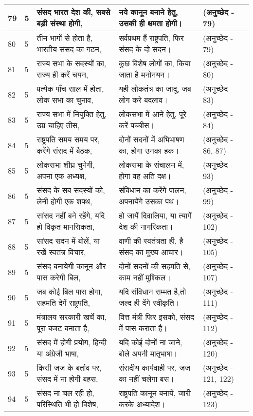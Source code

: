\begin{longtable}{|l|l|l|l|l|}
79 & 5 & संसद भारत देश की, सबसे बड़ी संस्था होगी, & नये कानून बनाने हेतु, उसकी ही क्षमता होगी। & (अनुच्छेद - 79) \\ \hline 
80 & 5 & तीन भागों से होता है, भारतीय संसद का गठन, & सर्वप्रथम हैं राष्ट्रपति, फिर संसद के दो सदन। & (अनुच्छेद - 79) \\ \hline 
81 & 5 & राज्य सभा के सदस्यों का, राज्य ही करें चयन, & कुछ विशेष लोगों का, किया जाता है मनोनयन। & (अनुच्छेद - 80) \\ \hline 
82 & 5 & प्रत्येक पाँच साल में होता, लोक सभा का चुनाव, & यही लोकतंत्र का जादू, जब लोग करे बदलाव। & (अनुच्छेद - 83) \\ \hline 
83 & 5 & राज्य सभा में नियुक्ति हेतु, उम्र चाहिए तीस, & लोकसभा में आने हेतु, पूरे करें पच्चीस। & (अनुच्छेद - 84) \\ \hline 
84 & 5 & राष्ट्रपति समय समय पर, करेंगे संसद में बैठक, & दोनों सदनों में अभिभाषण का, होगा उनका हक। & (अनुच्छेद - 86, 87) \\ \hline 
85 & 5 & लोकसभा शीघ्र चुनेगी, अपना एक अध्यक्ष, & लोकसभा के संचालन में, होगा वह अति दक्ष। & (अनुच्छेद - 93) \\ \hline 
86 & 5 & संसद के सब सदस्यों को, लेनी होगी एक शपथ, & संविधान का करेंगे पालन, अपनायेंगे उसका पथ। & (अनुच्छेद - 99) \\ \hline 
87 & 5 & सांसद नहीं बने रहेंगे, यदि हो विकृत मानसिकता, & हो जायें दिवालिया, या त्यागें देश की नागरिकता। & (अनुच्छेद - 102) \\ \hline 
88 & 5 & सांसद सदन में बोलें, या रखें स्वतंत्र विचार, & वाणी की स्वतंत्रता ही, है संसद का मुख्य आचार। & (अनुच्छेद - 105) \\ \hline 
89 & 5 & संसद बनायेगी कानून और पास करेगी बिल, & दोनों सदनों की सहमति से, काम नहीं मुश्किल। & (अनुच्छेद - 107) \\ \hline 
90 & 5 & जब कोई बिल पास होगा, सहमति देगें राष्ट्रपति, & यदि संविधान सम्मत है,तो जल्द ही देंगे स्वीकृति। & (अनुच्छेद - 111) \\ \hline 
91 & 5 & मंत्रालय सरकारी खर्चे का, पूरा बजट बनाता है, & वित्त मंत्री फिर इसको, संसद में पास कराता है। & (अनुच्छेद - 112) \\ \hline 
92 & 5 & संसद में होगी प्रयोग, हिन्दी या अंग्रेजी भाषा, & यदि कोई दोनों ना जाने, बोले अपनी मातृभाषा। & (अनुच्छेद - 120) \\ \hline 
93 & 5 & किसी जज के बर्ताव पर, संसद में ना होगी बहस, & संसदीय कार्यवाही पर, जज का नहीं चलेगा बस। & (अनुच्छेद - 121, 122) \\ \hline 
94 & 5 & संसद ना चल रही हो, परिस्थिति भी हो विशेष, & राष्ट्रपति कानून बनायें, जारी करके अध्यादेश। & (अनुच्छेद - 123) \\ \hline 

\end{longtable}
